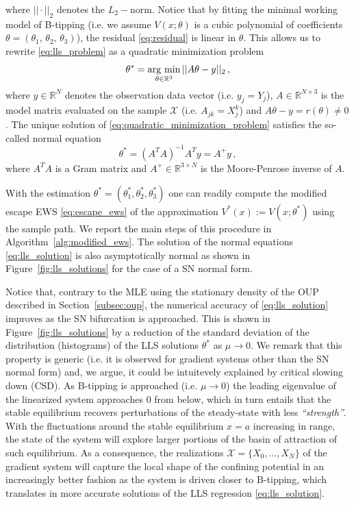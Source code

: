 \documentclass[10pt]{article}
\newcommand{\sref}[1]{Section~\ref{#1}}
\newcommand{\fref}[1]{Figure~\ref{#1}}
\begin{document}
%
where $||\cdot||_2$ denotes the $L_2-$norm.
Notice that by fitting the minimal working model of B-tipping (i.e. we assume $V(x;\theta)$ is a cubic polynomial of coefficients $\theta = (\theta_{1},\, \theta_{2},\, \theta_{3})$), the residual \eqref{eq:residual} is linear in $\theta$.
This allows us to rewrite \eqref{eq:lls_problem} as a quadratic minimization problem
%
\begin{equation}\label{eq:quadratic_minimization_problem}
        \theta^{*} = \operatorname*{\arg\,min}_{\theta\in \mathbb{R}^{3}}||A\theta - y||_2\,,
\end{equation}
%
where $y\in \mathbb{R}^{N}$ denotes the observation data vector (i.e. $y_j = Y_j$), $A\in \mathbb{R}^{N\times3}$ is the model matrix evaluated on the sample $\mathcal{X}$ (i.e. $A_{jk} = X_{j}^{k}$) and $A\theta - y = r(\theta) \neq 0$.
The unique solution of \eqref{eq:quadratic_minimization_problem} satisfies the so-called normal equation
%
\begin{equation}\label{eq:lls_solution}
        \theta^{*} = (A^{T}A)^{-1}A^{T}y = A^{+}y\,,
\end{equation}
%
where $A^TA$ is a Gram matrix and $A^{+}\in\mathbb{R}^{3\times N}$ is the Moore-Penrose inverse of $A$.

With the estimation $\theta^*=(\theta^*_1, \theta^*_2, \theta^*_3)$ one can readily compute the modified escape EWS \eqref{eq:escape_ews} of the approximation $V^*(x):=V(x;\theta^*)$ using the sample path. We report the main steps of this procedure in Algorithm~\ref{alg:modified_ews}.
The solution of the normal equations \eqref{eq:lls_solution} is also asymptotically normal as shown in \fref{fig:lls_solutions} for the case of a SN normal form.

Notice that, contrary to the MLE using the stationary density of the OUP described in \sref{subsec:oup}, the numerical accuracy of \eqref{eq:lls_solution} improves as the SN bifurcation is approached.
This is shown in \fref{fig:lls_solutions} by a reduction of the standard deviation of the distribution (histograms) of the LLS solutions $\theta^*$ as $\mu\to0$.
We remark that this property is generic (i.e. it is observed for gradient systems other than the SN normal form) and, we argue, it could be intuitevely explained by critical slowing down (CSD).
As B-tipping is approached (i.e. $\mu\to0$) the leading eigenvalue of the linearized system approaches $0$ from below, which in turn entails that the stable equilibrium recovers perturbations of the steady-state with less \textit{``strength''}.
With the fluctuations around the stable equilibrium $x=a$ increasing in range, the state of the system will explore larger portions of the basin of attraction of such equilibrium.
As a consequence, the realizations $\mathcal{X} = \{X_0,\dots,X_N\}$ of the gradient system will capture the local shape of the confining potential in an increasingly better fashion as the system is driven closer to B-tipping, which translates in more accurate solutions of the LLS regression \eqref{eq:lls_solution}.
\end{document}
